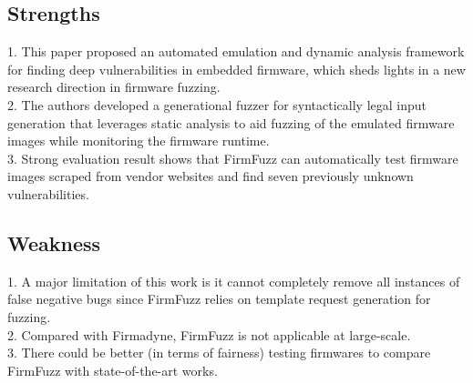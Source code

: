 \documentclass[letterpaper,11pt]{article}
\begin{document}
\subsection {Strengths}
1. This paper proposed an automated emulation and dynamic analysis framework for finding deep vulnerabilities in embedded firmware, which sheds lights in a new research direction in firmware fuzzing.\\
2. The authors developed a generational fuzzer for syntactically legal input generation that leverages static analysis to aid fuzzing of the emulated firmware images while monitoring the firmware runtime.\\
3. Strong evaluation result shows that FirmFuzz can automatically test firmware images scraped from vendor websites and find seven previously unknown vulnerabilities. 

\subsection {Weakness}
1. A major limitation of this work is it cannot completely remove all instances of false negative bugs since FirmFuzz relies on template request generation for fuzzing.\\ 
2. Compared with Firmadyne, FirmFuzz is not applicable at large-scale.\\ 
3. There could be better (in terms of fairness) testing firmwares to compare FirmFuzz with state-of-the-art works. 


  
\end{document}
